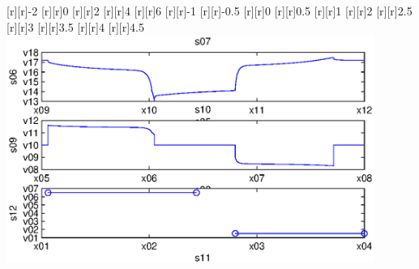 \begin{psfrags}
[r][r]{-2}%
[r][r]{0}%
[r][r]{2}%
[r][r]{4}%
[r][r]{6}%
[r][r]{-1}%
[r][r]{-0.5}%
[r][r]{0}%
[r][r]{0.5}%
[r][r]{1}%
[r][r]{2}%
[r][r]{2.5}%
[r][r]{3}%
[r][r]{3.5}%
[r][r]{4}%
[r][r]{4.5}%
%
\includegraphics[width=12cm]{batt_load_exp.eps}%
\end{psfrags}%
%
